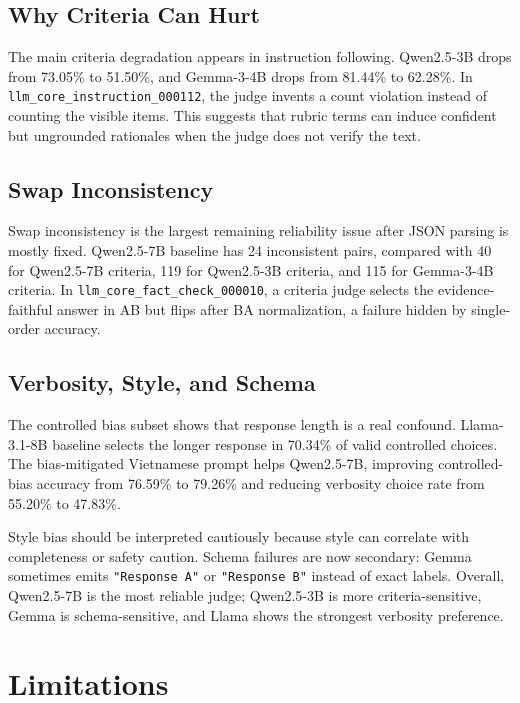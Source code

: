 \documentclass[pdflatex,sn-mathphys-num]{sn-jnl}
\begin{document}
\subsection{Why Criteria Can Hurt}

The main criteria degradation appears in instruction following. Qwen2.5-3B drops from 73.05\% to 51.50\%, and Gemma-3-4B drops from 81.44\% to 62.28\%. In \texttt{llm\_core\_instruction\_000112}, the judge invents a count violation instead of counting the visible items. This suggests that rubric terms can induce confident but ungrounded rationales when the judge does not verify the text.

\subsection{Swap Inconsistency}

Swap inconsistency is the largest remaining reliability issue after JSON parsing is mostly fixed. Qwen2.5-7B baseline has 24 inconsistent pairs, compared with 40 for Qwen2.5-7B criteria, 119 for Qwen2.5-3B criteria, and 115 for Gemma-3-4B criteria. In \texttt{llm\_core\_fact\_check\_000010}, a criteria judge selects the evidence-faithful answer in AB but flips after BA normalization, a failure hidden by single-order accuracy.

\subsection{Verbosity, Style, and Schema}

The controlled bias subset shows that response length is a real confound. Llama-3.1-8B baseline selects the longer response in 70.34\% of valid controlled choices. The bias-mitigated Vietnamese prompt helps Qwen2.5-7B, improving controlled-bias accuracy from 76.59\% to 79.26\% and reducing verbosity choice rate from 55.20\% to 47.83\%.

Style bias should be interpreted cautiously because style can correlate with completeness or safety caution. Schema failures are now secondary: Gemma sometimes emits \texttt{"Response A"} or \texttt{"Response B"} instead of exact labels. Overall, Qwen2.5-7B is the most reliable judge; Qwen2.5-3B is more criteria-sensitive, Gemma is schema-sensitive, and Llama shows the strongest verbosity preference.

\section{Limitations}
\end{document}

